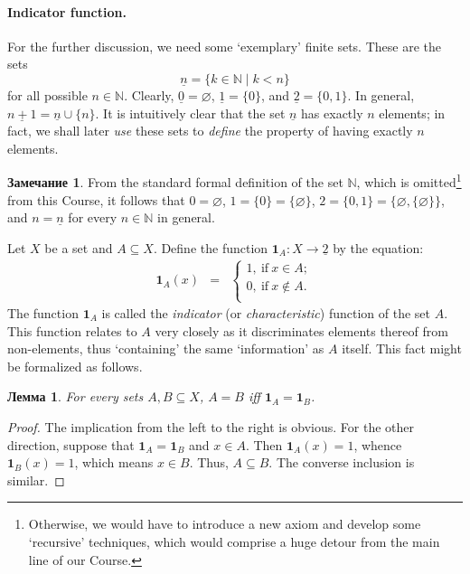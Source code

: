 \documentclass[12pt,notitlepage]{article}
\theoremstyle{plain}
\newtheorem{lemma}[thm]{Лемма}
\theoremstyle{definition}
\newtheorem{rem}[thm]{Замечание}
\theoremstyle{plain}
\newcommand{\N}{\mathbb{N}}
\newcommand{\sbs}{\subseteq}
\newcommand{\void}{\varnothing}
\newcommand{\ul}[1]{\underline{#1}}
\newcommand{\1}{\mathbf{1}}
\newcommand{\0}{\mathbf{0}}
\newcommand{\mcomm}[1]{}
\begin{document}
\paragraph{Indicator function.} For the further discussion, we need some `exemplary' finite sets. These are the sets
$$\ul{n} = \{ k \in \N \mid k < n \}$$
for all possible $n \in \N$. Clearly, $\ul{0} = \void$, $\ul{1} = \{0\}$, and $\ul{2} = \{0, 1\}$. In general, $\ul{n + 1} = \ul{n} \cup \{ n \}$. It is intuitively clear that the set $\ul{n}$ has exactly $n$ elements; in fact, we shall later \emph{use} these sets to \emph{define} the property of having exactly $n$ elements.

\begin{rem}
	From the standard formal definition of the set $\N$, which is omitted\footnote{Otherwise, we would have to introduce a new axiom and develop some `recursive' techniques, which would comprise a huge detour from the main line of our Course.} from this Course, it follows that $0 = \void$, $1 = \{0\} = \{ \void \}$, $2 = \{0, 1\} = \{ \void, \{\void\} \}$, and $n = \ul{n}$ for every $n \in \N$ in general.
\end{rem}
\mcomm{We usually ask students not to use the inner structure of naturals in any argument since this has not been ``officially'' defined in our Course.}

Let $X$ be a set and $A \sbs X$. Define the function $\1_A \colon X \to \ul{2}$ by the equation:
$$
\begin{array}{rcl}
	\1_A(x) &=& \begin{cases}
		1,\ \mbox{if}\ x \in A;\\
		0,\ \mbox{if}\ x \notin A.\\
	\end{cases}
\end{array}
$$
The function $\1_A$ is called the \emph{indicator} (or \emph{characteristic}) function of the set $A$. This function relates to $A$ very closely as it discriminates elements thereof from non-elements, thus `containing' the same `information' as $A$ itself. This fact might be formalized as follows.
\begin{lemma}\label{L9:char1}
	For every sets $A, B \sbs X$, $A = B$ iff $\1_A = \1_B$.
\end{lemma}
\begin{proof}
	The implication from the left to the right is obvious. For the other direction, suppose that $\1_A = \1_B$ and $x \in A$. Then $\1_A(x) = 1$, whence $\1_B(x) = 1$, which means $x \in B$. Thus, $A \sbs B$. The converse inclusion is similar.
\end{proof}
\end{document}
